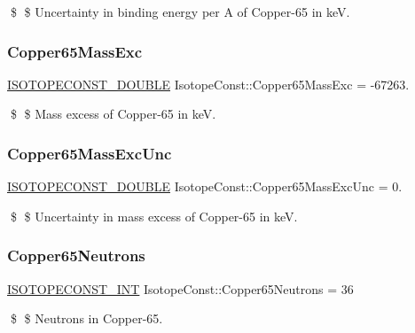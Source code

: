 \$ \$ Uncertainty in binding energy per A of Copper-\/65 in keV. \mbox{\label{group___isotope_const-_copper-_cu65_gac3b151029b0b54df2eb55a08b4fbdcb5}} 
\subsubsection{\texorpdfstring{Copper65\+Mass\+Exc}{Copper65MassExc}}
{\footnotesize\ttfamily \mbox{\hyperlink{group___isotope_const-_macros_ga8f45a7272ce02c0b4c65c44636ed719a}{I\+S\+O\+T\+O\+P\+E\+C\+O\+N\+S\+T\+\_\+\+D\+O\+U\+B\+LE}} Isotope\+Const\+::\+Copper65\+Mass\+Exc = -\/67263.}

\$ \$ Mass excess of Copper-\/65 in keV. \mbox{\label{group___isotope_const-_copper-_cu65_gae64abbbf083c9da12b296c2ca3e65e32}} 
\subsubsection{\texorpdfstring{Copper65\+Mass\+Exc\+Unc}{Copper65MassExcUnc}}
{\footnotesize\ttfamily \mbox{\hyperlink{group___isotope_const-_macros_ga8f45a7272ce02c0b4c65c44636ed719a}{I\+S\+O\+T\+O\+P\+E\+C\+O\+N\+S\+T\+\_\+\+D\+O\+U\+B\+LE}} Isotope\+Const\+::\+Copper65\+Mass\+Exc\+Unc = 0.}

\$ \$ Uncertainty in mass excess of Copper-\/65 in keV. \mbox{\label{group___isotope_const-_copper-_cu65_ga87db931d6c2cf9d4a0d20be1825667e6}} 
\subsubsection{\texorpdfstring{Copper65\+Neutrons}{Copper65Neutrons}}
{\footnotesize\ttfamily \mbox{\hyperlink{group___isotope_const-_macros_ga5f18360b3e99483a35c32d789e62621c}{I\+S\+O\+T\+O\+P\+E\+C\+O\+N\+S\+T\+\_\+\+I\+NT}} Isotope\+Const\+::\+Copper65\+Neutrons = 36}

\$ \$ Neutrons in Copper-\/65. \mbox{\label{group___isotope_const-_copper-_cu65_gaf2254b7167f55c2e73ba981f3b352287}} 
